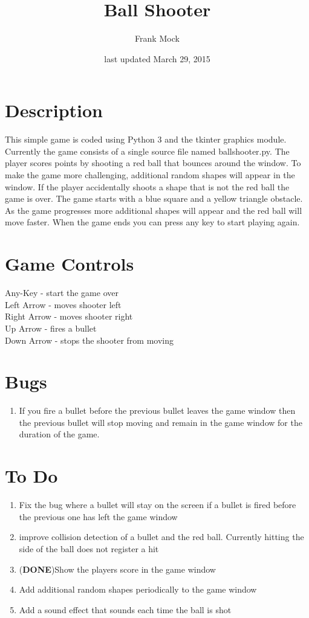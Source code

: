 \documentclass[12pt,letterpaper]{article}
\title{Ball Shooter}
\author{Frank Mock}
\date{\small last updated  \color{blue}March 29, 2015}
\begin{document}
\maketitle
\section*{Description}
This simple game is coded using Python 3 and the tkinter graphics module. Currently the game consists of a single source file named ballshooter.py. The player scores points by shooting a red ball that bounces around the window. To make the game more challenging, additional random shapes will appear in the window. If the player accidentally shoots a shape that is not the red ball the game is over. The game starts with a blue square and a yellow triangle obstacle. As the game progresses more additional shapes will appear and the red ball will move faster. When the game ends you can press any key to start playing again.
\section*{Game Controls}
Any-Key - start the game over\\
Left Arrow - moves shooter left\\
Right Arrow - moves shooter right\\
Up Arrow - fires a bullet\\
Down Arrow - stops the shooter from moving\\
\section*{Bugs}
\begin{enumerate}
 \item If you fire a bullet before the previous bullet leaves the game window then the previous bullet will stop moving and remain in the game window for the duration of the game.
\end{enumerate}
\section*{To Do}
\begin{enumerate}
 \item Fix the bug where a bullet will stay on the screen if a bullet is fired before the previous one has left the game window
 \item improve collision detection of a bullet and the red ball. Currently hitting the side of the ball does not register a hit
 \item (\textbf{DONE})Show the players score in the game window
 \item Add additional random shapes periodically to the game window
 \item Add a sound effect that sounds each time the ball is shot 
 \end{enumerate} 
\end{document}
